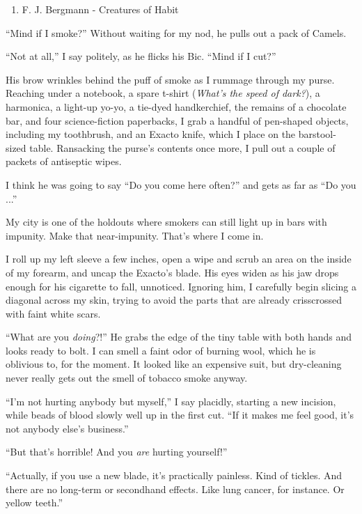 \begin{enumerate}
\def\labelenumi{\arabic{enumi}.}
\tightlist
\item
  F. J. Bergmann - Creatures of Habit
\end{enumerate}

``Mind if I smoke?'' Without waiting for my nod, he pulls out a pack of
Camels.

``Not at all,'' I say politely, as he flicks his Bic. ``Mind if I cut?''

His brow wrinkles behind the puff of smoke as I rummage through my
purse. Reaching under a notebook, a spare t-shirt (\emph{What's the
speed of dark?}), a harmonica, a light-up yo-yo, a tie-dyed
handkerchief, the remains of a chocolate bar, and four science-fiction
paperbacks, I grab a handful of pen-shaped objects, including my
toothbrush, and an Exacto knife, which I place on the barstool-sized
table. Ransacking the purse's contents once more, I pull out a couple of
packets of antiseptic wipes.

I think he was going to say ``Do you come here often?'' and gets as far
as ``Do you ...''

My city is one of the holdouts where smokers can still light up in bars
with impunity. Make that near-impunity. That's where {I} come in.

I roll up my left sleeve a few inches, open a wipe and scrub an area on
the inside of my forearm, and uncap the Exacto's blade. His eyes widen
as his jaw drops enough for his cigarette to fall, unnoticed. Ignoring
him, I carefully begin slicing a diagonal across my skin, trying to
avoid the parts that are already crisscrossed with faint white scars.

``What are you \emph{doing}?!'' He grabs the edge of the tiny table with
both hands and looks ready to bolt. I can smell a faint odor of burning
wool, which he is oblivious to, for the moment. It looked like an
expensive suit, but dry-cleaning never really gets out the smell of
tobacco smoke anyway.

``I'm not hurting anybody but myself,'' I say placidly, starting a new
incision, while beads of blood slowly well up in the first cut. ``If it
makes me feel good, it's not anybody else's business.''

``But that's horrible! And you \emph{are} hurting yourself!''

``Actually, if you use a new blade, it's practically painless. Kind of
tickles. And there are no long-term or secondhand effects. Like lung
cancer, for instance. Or yellow teeth.''

